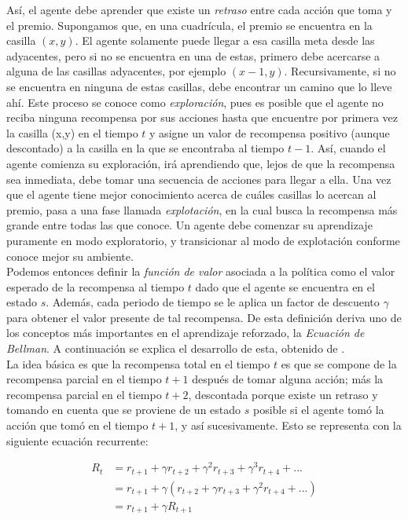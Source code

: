 As\'i, el agente debe aprender que existe un \textit{retraso} entre cada acci\'on que toma y el premio. Supongamos que, en una cuadr\'icula, el premio se encuentra en la casilla $(x,y)$. El agente solamente puede llegar a esa casilla meta desde las adyacentes, pero si no se encuentra en una de estas, primero debe acercarse a alguna de las casillas adyacentes, por ejemplo $(x-1,y)$. Recursivamente, si no se encuentra en ninguna de estas casillas, debe encontrar un camino que lo lleve ah\'i. Este proceso se conoce como \textit{exploraci\'on}, pues es posible que el agente no reciba ninguna recompensa por sus acciones hasta que encuentre por primera vez la casilla (x,y) en el tiempo $t$ y asigne un valor de recompensa positivo (aunque descontado) a la casilla en la que se encontraba al tiempo $t-1$. As\'i, cuando el agente comienza su exploraci\'on, ir\'a aprendiendo que, lejos de que la recompensa sea inmediata, debe tomar una secuencia de acciones para llegar a ella. Una vez que el agente tiene mejor conocimiento acerca de cu\'ales casillas lo acercan al premio, pasa a una fase llamada \textit{explotaci\'on}, en la cual busca la recompensa m\'as grande entre todas las que conoce. Un agente debe comenzar su aprendizaje puramente en modo exploratorio, y transicionar al modo de explotaci\'on conforme conoce mejor su ambiente.\\

Podemos entonces definir la \textit{funci\'on de valor} asociada a la pol\'itica como el valor esperado de la recompensa al tiempo $t$ dado que el agente se encuentra en el estado $s$. Adem\'as, cada periodo de tiempo se le aplica un factor de descuento $\gamma$ para obtener el valor presente de tal recompensa. De esta definici\'on deriva uno de los conceptos m\'as importantes en el aprendizaje reforzado, la \textit{Ecuaci\'on de Bellman}. A continuaci\'on se explica el desarrollo de esta, obtenido de \citet{Sutton}. \\

La idea b\'asica es que la recompensa total en el tiempo $t$ es que se compone de la recompensa parcial en el tiempo $t+1$ despu\'es de tomar alguna acci\'on; m\'as la recompensa parcial en el tiempo $t+2$, descontada porque existe un retraso y tomando en cuenta que se proviene de un estado $s$ posible si el agente tom\'o la acci\'on que tom\'o en el tiempo $t+1$, y as\'i sucesivamente. Esto se representa con la siguiente ecuaci\'on recurrente:

\vspace{-30pt}
\begin{align*}
R_{t} &= r_{t+1} + \gamma r_{t+2} + \gamma^{2} r_{t+3} + \gamma^{3} r_{t+4} + ... \\
    &= r_{t+1} + \gamma \left( r_{t+2} + \gamma r_{t+3} + \gamma^{2}r_{t+4} + ...  \right)  \\
    &= r_{t+1} + \gamma R_{t+1}
\end{align*}


